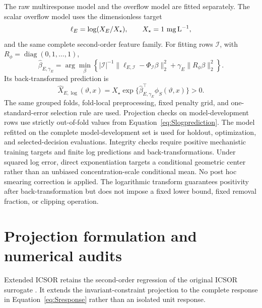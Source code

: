 \documentclass[a4paper,fleqn]{cas-sc}
\begin{document}
The raw multiresponse model and the overflow model are fitted separately. The scalar overflow model uses the dimensionless target
\begin{equation}
\ell_E=\log(X_E/X_\star),\qquad X_\star=1\ {\rm mg\,L^{-1}},
\end{equation}
and the same complete second-order feature family. For fitting rows $\mathcal I$, with $R_\phi=\operatorname{diag}(0,1,\ldots,1)$,
\begin{equation}
\widehat\beta_{E,\gamma_E}=\arg\min_\beta
\left\{|\mathcal I|^{-1}\|\ell_{E,\mathcal I}-\Phi_{\mathcal I}\beta\|_2^2
+\gamma_E\|R_\phi\beta\|_2^2\right\}.
\label{eq:Slogridge}
\end{equation}
Its back-transformed prediction is
\begin{equation}
\widehat X_{E,\log}(\vartheta,x)=X_\star
\exp\{\widehat\beta_{E,\gamma_E}^{\top}\phi_S(\vartheta,x)\}>0.
\label{eq:Slogprediction}
\end{equation}
The same grouped folds, fold-local preprocessing, fixed penalty grid, and one-standard-error selection rule are used. Projection checks on model-development rows use strictly out-of-fold values from Equation~\eqref{eq:Slogprediction}. The model refitted on the complete model-development set is used for holdout, optimization, and selected-decision evaluations. Integrity checks require positive mechanistic training targets and finite log predictions and back-transformations. Under squared log error, direct exponentiation targets a conditional geometric center rather than an unbiased concentration-scale conditional mean. No post hoc smearing correction is applied. The logarithmic transform guarantees positivity after back-transformation but does not impose a fixed lower bound, fixed removal fraction, or clipping operation.

\section{Projection formulation and numerical audits}

Extended ICSOR retains the second-order regression of the original ICSOR surrogate \citep{Selerio2026}. It extends the invariant-constraint projection to the complete response in Equation~\eqref{eq:Sresponse} rather than an isolated unit response.
\end{document}
